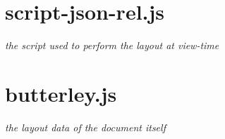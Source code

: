 \section{script-json-rel.js}
\emph{the script used to perform the layout at view-time}


\newpage

\section{butterley.js}
\emph{the layout data of the document itself}

